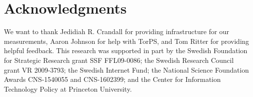 \section*{Acknowledgments}
We want to thank Jedidiah R. Crandall for providing infrastructure for our
measurements, Aaron Johnson for help with TorPS, and Tom Ritter for providing
helpful feedback.
%
This research was supported in part by the Swedish Foundation for Strategic
Research grant SSF FFL09-0086; the Swedish Research Council grant VR 2009-3793;
the Swedish Internet Fund; the National Science Foundation Awards CNS-1540055
and CNS-1602399; and the Center for Information Technology Policy at Princeton
University.
